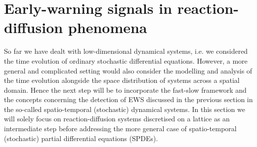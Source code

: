 \documentclass[../main.tex]{subfiles}
\begin{document}
\newpage
\section{Early-warning signals in reaction-diffusion phenomena}\label{sec3}
So far we have dealt with low-dimensional dynamical systems, i.e. we considered the time evolution of ordinary stochastic differential equations. 
However, a more general and complicated setting would also consider the modelling and analysis of the time evolution alongside the space distribution of systems across a spatial domain. 
Hence the next step will be to incorporate the fast-slow framework and the concepts concerning the detection of EWS discussed in the previous section in the so-called spatio-temporal (stochastic) dynamical systems.
In this section we will solely focus on reaction-diffusion systems discretised on a lattice as an intermediate step before addressing the more general case of spatio-temporal (stochastic) partial differential equations (SPDEs).
\end{document}
